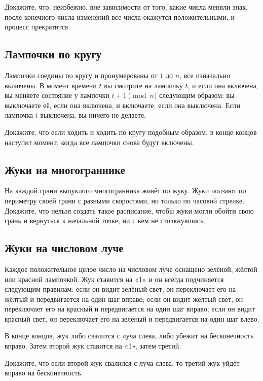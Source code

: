 Докажите, что, неизбежно, вне зависимости от того, какие числа меняли знак, после конечного числа изменений все числа окажутся положительными, и процесс прекратится.

\subsection*{Лампочки по кругу}%

Лампочки соедины по кругу и пронумерованы от $1$ до $n$, все изначально включены.
В момент времени $t$ вы смотрите на лампочку $t$, и если она включена, вы меняете состояние у лампочки $t + 1 \pmod{n}$ следующим образом: вы выключаете её, если она включена, и включаете, если она выключена.
Если лампочка $t$ выключена, вы ничего не делаете.

Докажите, что если ходить и ходить по кругу подобным образом, в конце концов наступит момент, когда все лампочки снова будут включены.

\subsection*{Жуки на многограннике}%

На каждой грани выпуклого многогранника живёт по жуку.
Жуки ползают по периметру своей грани с разными скоростями, но только по часовой стрелке.
Докажите, что нельзя создать такое расписание, чтобы жуки могли обойти свою грань и вернуться к начальной точке, ни с кем не столкнувшись.

\subsection*{Жуки на числовом луче}%

Каждое положительное целое число на числовом луче оснащено зелёной, жёлтой или красной лампочкой.
Жук ставится на «1» и он всегда подчиняется следующим правилам: если он видит зелёный свет, он переключает его на жёлтый и передвигается на один шаг вправо; 
если он видит жёлтый свет, он переключает его на красный и передвигается на один шаг вправо; 
если он видит красный свет, он переключает его на зелёный и передвигается на один шаг влево.

В конце концов, жук либо свалится с луча слева, либо убежит на бесконечность вправо.
Затем второй жук ставится на «1», затем третий.

Докажите, что если второй жук свалился с луча слева, то третий жук уйдёт вправо на бесконечность.

